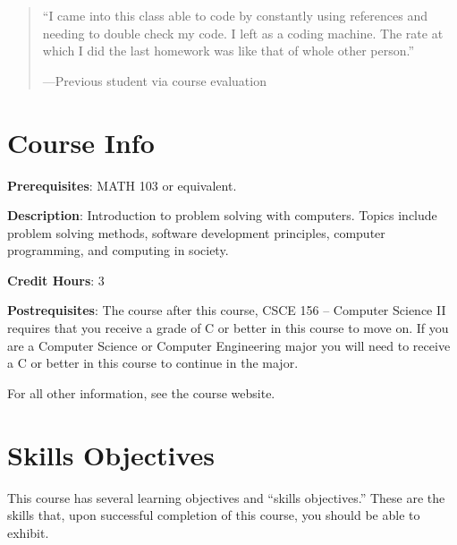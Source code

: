 \documentclass[12pt]{scrartcl}
\begin{document}
\begin{quote}
``I came into this class able to code by constantly using references 
and needing to double check my code. I left as a coding machine. The 
rate at which I did the last homework was like that of whole other 
person.''

\hfill ---Previous student via course evaluation
\end{quote}




\section{Course Info}

\textbf{Prerequisites}: MATH 103 or equivalent.

\textbf{Description}: Introduction to problem solving with computers. 
Topics include problem solving methods, software development 
principles, computer programming, and computing in society.

\textbf{Credit Hours}: 3

\textbf{Postrequisites}: The course after this course, CSCE 156 -- Computer 
Science II requires that you receive a grade of C or better in this course to
move on.  If you are a Computer Science or Computer Engineering major you will
need to receive a C or better in this course to continue in the major.  

For all other information, see the course website.

\section{Skills Objectives}

This course has several learning objectives and ``skills objectives.''
These are the skills that, upon successful completion of this course, 
you should be able to exhibit.
\end{document}
